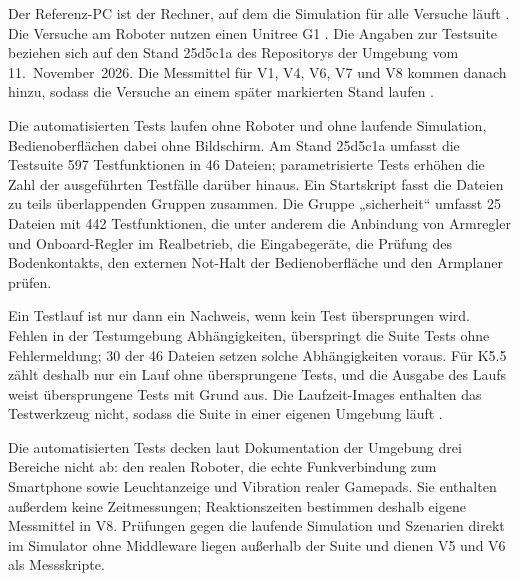 Der Referenz-PC ist der Rechner, auf dem die Simulation für alle Versuche läuft .
Die Versuche am Roboter nutzen einen Unitree G1 .
Die Angaben zur Testsuite beziehen sich auf den Stand 25d5c1a des Repositorys der Umgebung vom 11.~November~2026.
Die Messmittel für V1, V4, V6, V7 und V8 kommen danach hinzu, sodass die Versuche an einem später markierten Stand laufen .

Die automatisierten Tests laufen ohne Roboter und ohne laufende Simulation, Bedienoberflächen dabei ohne Bildschirm.
Am Stand 25d5c1a umfasst die Testsuite 597 Testfunktionen in 46 Dateien; parametrisierte Tests erhöhen die Zahl der ausgeführten Testfälle darüber hinaus.
Ein Startskript fasst die Dateien zu teils überlappenden Gruppen zusammen.
Die Gruppe „sicherheit“ umfasst 25 Dateien mit 442 Testfunktionen, die unter anderem die Anbindung von Armregler und Onboard-Regler im Realbetrieb, die Eingabegeräte, die Prüfung des Bodenkontakts, den externen Not-Halt der Bedienoberfläche und den Armplaner prüfen.

Ein Testlauf ist nur dann ein Nachweis, wenn kein Test übersprungen wird.
Fehlen in der Testumgebung Abhängigkeiten, überspringt die Suite Tests ohne Fehlermeldung; 30 der 46 Dateien setzen solche Abhängigkeiten voraus.
Für K5.5 zählt deshalb nur ein Lauf ohne übersprungene Tests, und die Ausgabe des Laufs weist übersprungene Tests mit Grund aus.
Die Laufzeit-Images enthalten das Testwerkzeug nicht, sodass die Suite in einer eigenen Umgebung läuft .

Die automatisierten Tests decken laut Dokumentation der Umgebung drei Bereiche nicht ab: den realen Roboter, die echte Funkverbindung zum Smartphone sowie Leuchtanzeige und Vibration realer Gamepads.
Sie enthalten außerdem keine Zeitmessungen; Reaktionszeiten bestimmen deshalb eigene Messmittel in V8.
Prüfungen gegen die laufende Simulation und Szenarien direkt im Simulator ohne Middleware liegen außerhalb der Suite und dienen V5 und V6 als Messskripte.

